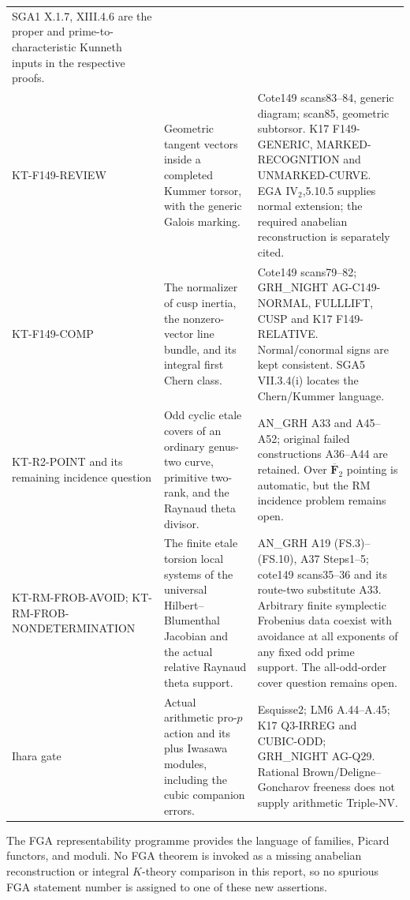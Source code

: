 \begin{longtable}{>{\raggedright\arraybackslash}p{}
>{\raggedright\arraybackslash}p{}
>{\raggedright\arraybackslash}p{}}
SGA1 X.1.7, XIII.4.6 are the proper and prime-to-characteristic
Kunneth inputs in the respective proofs.\\
KT-F149-REVIEW &
Geometric tangent vectors inside a completed Kummer torsor,
with the generic Galois marking. &
Cote149 scans83--84, generic diagram; scan85, geometric
subtorsor. K17 F149-GENERIC, MARKED-RECOGNITION and
UNMARKED-CURVE. EGA IV$_2$,5.10.5 supplies normal extension;
the required anabelian reconstruction is separately cited.\\
KT-F149-COMP &
The normalizer of cusp inertia, the nonzero-vector line bundle,
and its integral first Chern class. &
Cote149 scans79--82; GRH\_NIGHT AG-C149-NORMAL, FULLLIFT,
CUSP and K17 F149-RELATIVE. Normal/conormal signs are kept
consistent. SGA5 VII.3.4(i) locates the Chern/Kummer language.\\
KT-R2-POINT and its remaining incidence question &
Odd cyclic etale covers of an ordinary genus-two curve,
primitive two-rank, and the Raynaud theta divisor. &
AN\_GRH A33 and A45--A52; original failed constructions
A36--A44 are retained. Over $\overline{\mathbf F}_2$ pointing
is automatic, but the RM incidence problem remains open.\\
KT-RM-FROB-AVOID; KT-RM-FROB-NONDETERMINATION &
The finite etale torsion local systems of the universal
Hilbert--Blumenthal Jacobian and the actual relative
Raynaud theta support. &
AN\_GRH A19 (FS.3)--(FS.10), A37 Steps1--5;
cote149 scans35--36 and its route-two substitute A33.
Arbitrary finite symplectic Frobenius data coexist with
avoidance at all exponents of any fixed odd prime support.
The all-odd-order cover question remains open.\\
Ihara gate &
Actual arithmetic pro-$p$ action and its plus Iwasawa modules,
including the cubic companion errors. &
Esquisse2; LM6 A.44--A.45; K17 Q3-IRREG and CUBIC-ODD;
GRH\_NIGHT AG-Q29. Rational Brown/Deligne--Goncharov
freeness does not supply arithmetic Triple-NV.\\
\bottomrule
\end{longtable}
\normalsize

The FGA representability programme provides the language of
families, Picard functors, and moduli. No FGA theorem is
invoked as a missing anabelian reconstruction or integral
$K$-theory comparison in this report, so no spurious FGA
statement number is assigned to one of these new assertions.
